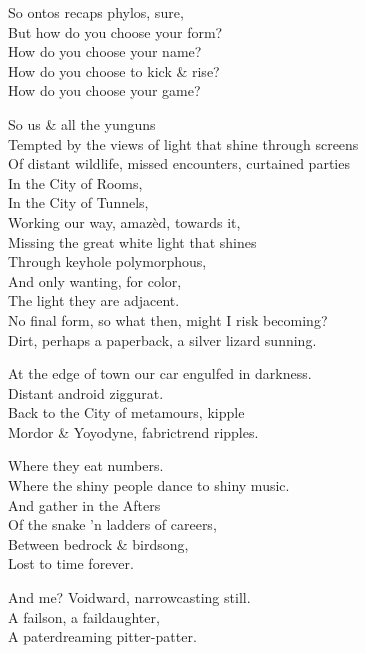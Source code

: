 So ontos recaps phylos, sure, \\
But how do you choose your form? \\
How do you choose your name? \\
How do you choose to kick \& rise? \\
How do you choose your game?

So us \& all the yunguns \\
Tempted by the views of light that shine through screens \\
Of distant wildlife, missed encounters, curtained parties \\
In the City of Rooms, \\
In the City of Tunnels, \\
Working our way, amazèd, towards it, \\
Missing the great white light that shines \\
Through keyhole polymorphous, \\
And only wanting, for color, \\
The light they are adjacent. \\
No final form, so what then, might I risk becoming? \\
Dirt, perhaps a paperback, a silver lizard sunning.

At the edge of town our car engulfed in darkness. \\
Distant android ziggurat. \\
Back to the City of metamours, kipple \\
Mordor \& Yoyodyne, fabrictrend ripples.

Where they eat numbers. \\
Where the shiny people dance to shiny music. \\
And gather in the Afters \\
Of the snake 'n ladders of careers, \\
Between bedrock \& birdsong, \\
Lost to time forever.

And me? Voidward, narrowcasting still. \\
A failson, a faildaughter, \\
A paterdreaming pitter-patter.
